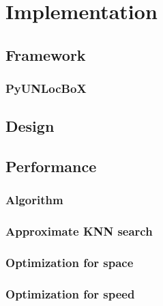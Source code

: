 \documentclass[a4paper,12pt,twoside]{report}
\begin{document}
\chapter{Implementation}

\section{Framework}

\subsection{PyUNLocBoX}

\section{Design}

\section{Performance}

\subsection{Algorithm}

\subsection{Approximate KNN search}

\subsection{Optimization for space}

\subsection{Optimization for speed}
\end{document}
